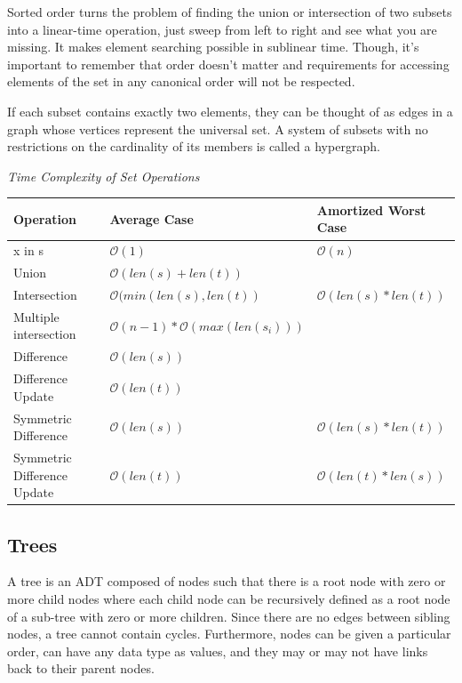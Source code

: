 \documentclass{article}
\newcommand{\bigO}{\mathcal{O}}
\begin{document}
    Sorted order turns the problem of finding the union or intersection of two subsets into a linear-time operation, just sweep from left to right and see what you are missing. It makes element searching possible in sublinear time. Though, it's important to remember that order doesn’t matter and requirements for accessing elements of the set in any canonical order will not be respected.
    
    If each subset contains exactly two elements, they can be thought of as edges in a graph whose vertices represent the universal set. A system of subsets with no restrictions on the cardinality of its members is called a hypergraph.
    
    \vspace{8pt} \emph{Time Complexity of Set Operations}
    \begin{table}[H]
        \begin{tabular}{|l|l|l|}
            \hline
            \textbf{Operation} & \textbf{Average Case} & \textbf{Amortized Worst Case} \\
            \hline
            x in s & $\bigO(1)$ & $\bigO(n)$ \\
            Union & $\bigO(len(s)+len(t))$  & \\
            Intersection & $\bigO(min(len(s), len(t))$ & $\bigO(len(s) * len(t))$ \\
            Multiple intersection & $\bigO(n-1)*\bigO(max(len(s_i)))$ &\\
            Difference & $\bigO(len(s))$ & \\
            Difference Update & $\bigO(len(t))$ & \\
            Symmetric Difference & $\bigO(len(s))$ & $\bigO(len(s) * len(t))$ \\
            Symmetric Difference Update & $\bigO(len(t))$ & $\bigO(len(t) * len(s))$\\
            \hline
        \end{tabular}
    \end{table}

    \subsection{Trees}
    A tree is an ADT composed of nodes such that there is a root node with zero or more child nodes where each child node can be recursively defined as a root node of a sub-tree with zero or more children. Since there are no edges between sibling nodes, a tree cannot contain cycles. Furthermore, nodes can be given a particular order, can have any data type as values, and they may or may not have links back to their parent nodes.
    
\end{document}
